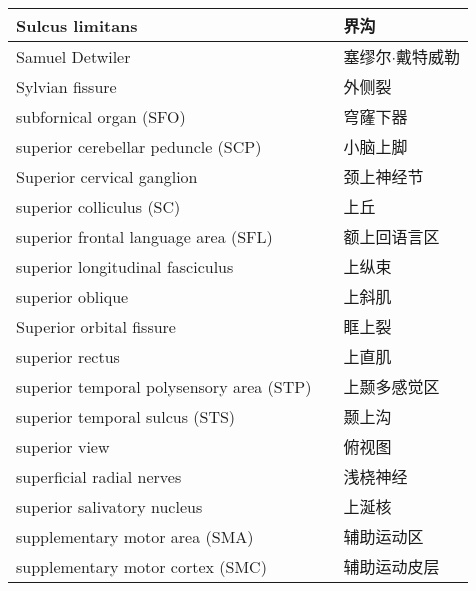 \begin{longtable}{lll}
	\midrule
	Sulcus limitans   && 界沟 \\
	
	\midrule
	Samuel Detwiler   && 塞缪尔$\cdot$戴特威勒 \\
	
	\midrule
	Sylvian fissure   && 外侧裂 \\
	
	\midrule
	subfornical organ (SFO)  && 穹窿下器 \\
	
	\midrule
	superior cerebellar peduncle (SCP)  && 小脑上脚 \\
	
	\midrule
	Superior cervical ganglion   && 颈上神经节 \\
	
	\midrule
	superior colliculus (SC)  && 上丘 \\
	
	\midrule
	superior frontal language area (SFL) && 额上回语言区 \\
	
	\midrule
	superior longitudinal fasciculus   && 上纵束 \\
	
	\midrule
	superior oblique   && 上斜肌 \\
	
	\midrule
	Superior orbital fissure   && 眶上裂 \\
	
	\midrule
	superior rectus   && 上直肌 \\
	
	\midrule
	superior temporal polysensory area (STP)   && 上颞多感觉区 \\
	
	\midrule
	superior temporal sulcus (STS)   && 颞上沟 \\
	
	\midrule
	superior view   && 俯视图 \\
	
	\midrule
	superficial radial nerves   && 浅桡神经 \\
	
	\midrule
	superior salivatory nucleus   && 上涎核 \\
	
	\midrule
	supplementary motor area (SMA)   && 辅助运动区 \\
	
	\midrule
	supplementary motor cortex (SMC)   && 辅助运动皮层 \\
	

\end{longtable}
